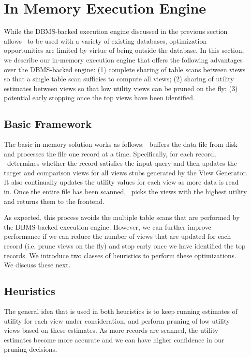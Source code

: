 \section{In Memory Execution Engine}
\label{sec:in_memory_execution_engine}

While the DBMS-backed execution engine discussed in the previous section allows
\SeeDB\ to be used with a variety of existing databases, optimization
opportunities are limited by virtue of being outside the database. In this
section, we describe our in-memory execution engine that offers the following
advantages over the DBMS-backed engine: (1) complete sharing of table scans
between views so that a single table scan sufficies to compute all views; (2)
sharing of utility estimates between views so that low utility views can be
pruned on the fly; (3) potential early stopping once the top views have been
identified.

\subsection{Basic Framework}
\label{subsec:basic_framework}
The basic in-memory solution works as follows: \SeeDB\ buffers the data file
from disk and processes the file one record at a time. Specifically, for each
record, \SeeDB\ determines whether the record satisfies the input query and then
updates the target and comparison views for all views stubs generated by the
View Generator. It also continually updates the utility values for each view as
more data is read in. Once the entire file has been scanned, \SeeDB\ picks the
views with the highest utility and returns them to the frontend.

As expected, this process avoids the multiple table scans that are performed by
the DBMS-backed execution engine. 
However, we can further improve performance if we can reduce the number of views
that are updated for each record (i.e. prune views on the fly) and stop early
once we have identified the top records. 
We introduce two classes of heuristics to perform these optimizations.
We discuss these next.

\subsection{Heuristics}
\label{subsec:heuristics}

The general idea that is used in both heuristics is to keep running estimates of
utility for each view under consideration, and perform pruning of low utility
views based on these estimates. 
As more records are scanned, the utility estimates become more accurate and we
can have higher confidence in our pruning decisions.

